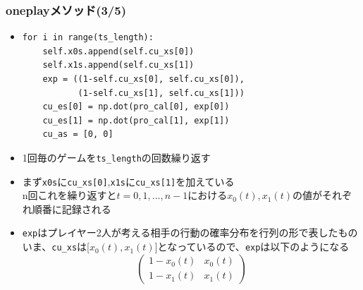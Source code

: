 \documentclass[dvipdfmx,fleqn]{beamer}
\begin{document}
\begin{frame}[fragile]%
\frametitle{oneplayメソッド(3/5)}
\begin{itemize}\setlength{\parskip}{0.5em}
\item
\footnotesize
\begin{verbatim}   
for i in range(ts_length):
    self.x0s.append(self.cu_xs[0])
    self.x1s.append(self.cu_xs[1])
    exp = ((1-self.cu_xs[0], self.cu_xs[0]),
           (1-self.cu_xs[1], self.cu_xs[1]))
    cu_es[0] = np.dot(pro_cal[0], exp[0])
    cu_es[1] = np.dot(pro_cal[1], exp[1])
    cu_as = [0, 0]
\end{verbatim}\pause
\normalsize
\item
1回毎のゲームを\verb|ts_length|の回数繰り返す\pause
\item
まず\verb|x0s|に\verb|cu_xs[0]|,\verb|x1s|に\verb|cu_xs[1]|を加えている\pause
\\n回これを繰り返すと$t=0,1,\dots,n-1$における$x_0(t),x_1(t)$の値がそれぞれ順番に記録される
\item
\verb|exp|はプレイヤー2人が考える相手の行動の確率分布を行列の形で表したもの\pause\\
いま、\verb|cu_xs|は[$x_0(t),x_1(t)$]となっているので、\verb|exp|は以下のようになる\pause
\footnotesize
\begin{equation*}
\begin{pmatrix}
1-x_0(t) & x_0(t)\\
1-x_1(t) & x_1(t)
\end{pmatrix}
\end{equation*}
\normalsize
\end{itemize}
\end{frame}
\end{document}
